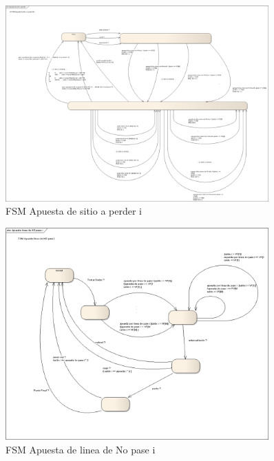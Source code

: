         \begin{figure}[p!hbt]
		\centering
		\includegraphics[angle=90, width=0.9\textwidth]{../img/FSM_ApuestaDeSitioAPerder.png}
		\caption{FSM Apuesta de sitio a perder i }
		\label{fig:apDeSitioAPerder}
	\end{figure}

        \begin{figure}[p!hbt]
		\centering
		\includegraphics[angle=90, width=0.9\textwidth]{../img/FSM_ApuestaLineaDeNoPase.png}
		\caption{FSM Apuesta de linea de No pase i }
		\label{fig:FSM_ApuestaLineaDeNoPase}
	\end{figure}

